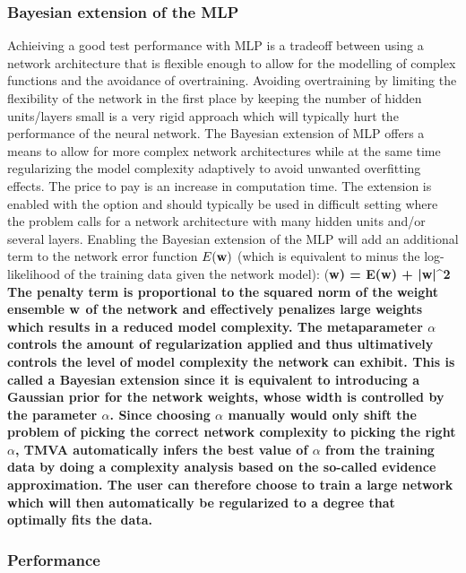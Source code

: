 \subsubsection{Bayesian extension of the MLP}
\label{sec:ann:bayes}
Achieiving a good test performance with MLP is a tradeoff between using a network architecture that is flexible enough to allow for the modelling of complex functions and the avoidance of overtraining. Avoiding overtraining by limiting the flexibility of the network in the first place by keeping the number of hidden units/layers small is a very rigid approach which will typically hurt the performance of the neural network. The Bayesian extension of MLP offers a means to allow for more complex network architectures while at the same time regularizing the model complexity adaptively to avoid unwanted overfitting effects. The price to pay is an increase in computation time. The extension is enabled with the option  and should typically be used in difficult setting where the problem calls for a network architecture with many hidden units and/or several layers.
Enabling the Bayesian extension of the MLP will add an additional term to the network error function $E(\bf w)$ (which is equivalent to minus the log-likelihood of the training data given the network model):
\beq
  \label{eq:mlp:penalty}
	(\bf w) = E(\bf w) + \alpha\bf |w|^2
\eeq
The penalty term is proportional to the squared norm of the weight ensemble $\bf w$ of the network and effectively penalizes large weights which results in a reduced model complexity. The metaparameter $\alpha$ controls the amount of regularization applied and thus ultimatively controls the level of model complexity the network can exhibit. This is called a Bayesian extension since it is equivalent to introducing a Gaussian prior for the network weights, whose width is controlled by the parameter $\alpha$. Since choosing $\alpha$ manually would only shift the problem of picking the correct network complexity to picking the right $\alpha$, TMVA automatically infers the best value of $\alpha$ from the training data by doing a complexity analysis based on the so-called evidence approximation. The user can therefore choose to train a large network which will then automatically be regularized to a degree that optimally fits the data.

\subsubsection{Performance}
\label{sec:ann:perf}

